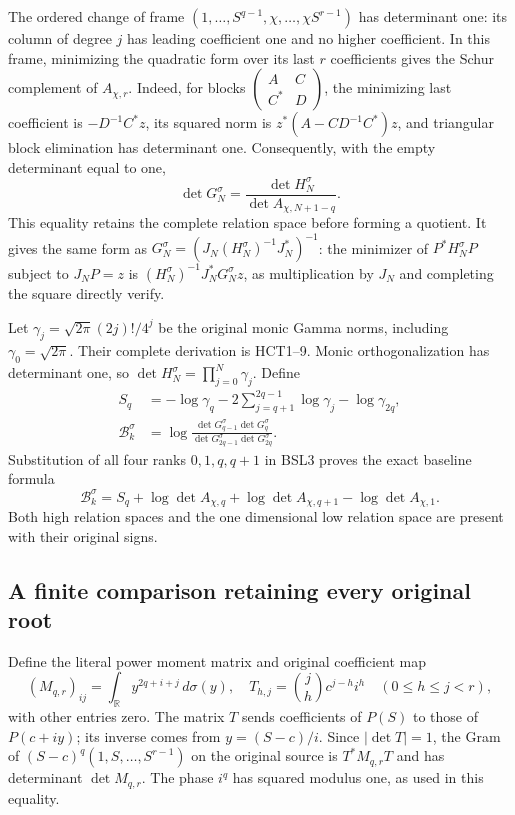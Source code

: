 \documentclass[11pt,a4paper]{article}
\newcommand{\C}{\mathbb C}
\begin{document}
The ordered change of frame
$(1,\ldots,S^{q-1},\chi,\ldots,\chi S^{r-1})$ has determinant one:
its column of degree $j$ has leading coefficient one and no higher
coefficient. In this frame, minimizing the quadratic form over its last
$r$ coefficients gives the Schur complement of $A_{\chi,r}$.
Indeed, for blocks $\left(\begin{smallmatrix}A&C\\C^*&D\end{smallmatrix}\right)$,
the minimizing last coefficient is $-D^{-1}C^*z$, its squared norm is
$z^*(A-CD^{-1}C^*)z$, and triangular block elimination has determinant
one. Consequently, with the empty determinant equal to one,
\[
 \det G_N^\sigma=\frac{\det H_N^\sigma}{\det A_{\chi,N+1-q}}.
 \tag{BSL3}
\]
This equality retains the complete relation space before forming a
quotient. It gives the same form as
$G_N^\sigma=(J_N(H_N^\sigma)^{-1}J_N^*)^{-1}$: the minimizer of
$P^*H_N^\sigma P$ subject to $J_NP=z$ is
$(H_N^\sigma)^{-1}J_N^*G_N^\sigma z$, as multiplication by $J_N$
and completing the square directly verify.

Let $\gamma_j=\sqrt{2\pi}(2j)!/4^j$ be the original monic Gamma
norms, including $\gamma_0=\sqrt{2\pi}$. Their complete derivation is
HCT1--9. Monic orthogonalization has determinant one, so
$\det H_N^\sigma=\prod_{j=0}^N\gamma_j$. Define
\[
 \begin{split}
 S_q&=-\log\gamma_q-2\sum_{j=q+1}^{2q-1}\log\gamma_j
                      -\log\gamma_{2q},\\
 \mathcal B_k^\sigma
 &=\log\frac{\det G_{q-1}^\sigma\det G_q^\sigma}
                   {\det G_{2q-1}^\sigma\det G_{2q}^\sigma}.
 \end{split}
\]
Substitution of all four ranks $0,1,q,q+1$ in BSL3 proves the exact
baseline formula
\[
 \boxed{\mathcal B_k^\sigma
 =S_q+\log\det A_{\chi,q}+\log\det A_{\chi,q+1}
                         -\log\det A_{\chi,1}.}
 \tag{BSL4}
\]
Both high relation spaces and the one dimensional low relation space
are present with their original signs.

\subsection{A finite comparison retaining every original root}
Define the literal power moment matrix and original coefficient map
\[
 (M_{q,r})_{ij}=\int_{\mathbb R}y^{2q+i+j}\,d\sigma(y),\quad
 T_{h,j}=\binom jh c^{j-h}i^h\quad(0\leq h\leq j<r),
 \tag{BSL5}
\]
with other entries zero. The matrix $T$ sends coefficients of $P(S)$
to those of $P(c+iy)$; its inverse comes from $y=(S-c)/i$.
Since $|\det T|=1$, the Gram of
$(S-c)^q(1,S,\ldots,S^{r-1})$ on the original source is
$T^*M_{q,r}T$ and has determinant $\det M_{q,r}$.
The phase $i^q$ has squared modulus one, as used in this equality.
\end{document}
